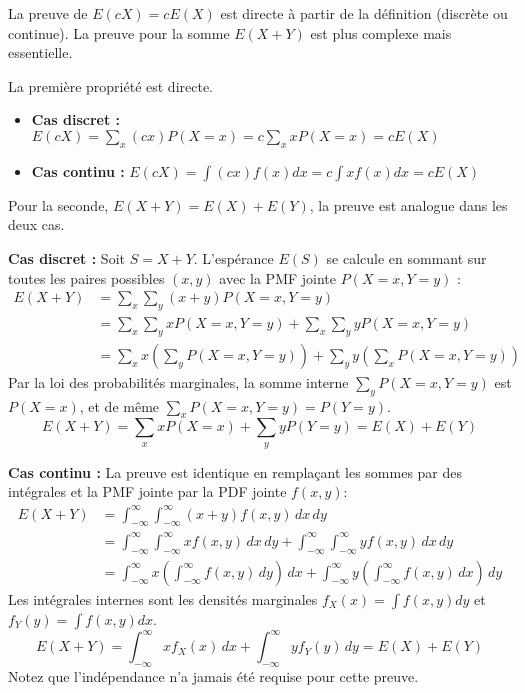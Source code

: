 La preuve de $E(cX) = cE(X)$ est directe à partir de la définition (discrète ou continue). La preuve pour la somme $E(X+Y)$ est plus complexe mais essentielle.

\begin{proofbox}
La première propriété est directe.
\begin{itemize}
    \item \textbf{Cas discret :} $ E(cX) = \sum_x (cx) P(X=x) = c \sum_x x P(X=x) = cE(X) $
    \item \textbf{Cas continu :} $ E(cX) = \int (cx) f(x) dx = c \int x f(x) dx = cE(X) $
\end{itemize}

Pour la seconde, $E(X+Y) = E(X) + E(Y)$, la preuve est analogue dans les deux cas.

\textbf{Cas discret :} Soit $S = X+Y$. L'espérance $E(S)$ se calcule en sommant sur toutes les paires possibles $(x, y)$ avec la PMF jointe $P(X=x, Y=y)$ :
\begin{align*}
E(X+Y) &= \sum_x \sum_y (x+y) P(X=x, Y=y) \\
&= \sum_x \sum_y x P(X=x, Y=y) + \sum_x \sum_y y P(X=x, Y=y) \\
&= \sum_x x \left( \sum_y P(X=x, Y=y) \right) + \sum_y y \left( \sum_x P(X=x, Y=y) \right)
\end{align*}
Par la loi des probabilités marginales, la somme interne $\sum_y P(X=x, Y=y)$ est $P(X=x)$, et de même $\sum_x P(X=x, Y=y) = P(Y=y)$.
$$ E(X+Y) = \sum_x x P(X=x) + \sum_y y P(Y=y) = E(X) + E(Y) $$

\textbf{Cas continu :} La preuve est identique en remplaçant les sommes par des intégrales et la PMF jointe par la PDF jointe $f(x, y)$:
\begin{align*}
E(X+Y) &= \int_{-\infty}^{\infty} \int_{-\infty}^{\infty} (x+y) f(x, y) \, dx \, dy \\
&= \int_{-\infty}^{\infty} \int_{-\infty}^{\infty} x f(x, y) \, dx \, dy + \int_{-\infty}^{\infty} \int_{-\infty}^{\infty} y f(x, y) \, dx \, dy \\
&= \int_{-\infty}^{\infty} x \left( \int_{-\infty}^{\infty} f(x, y) \, dy \right) \, dx + \int_{-\infty}^{\infty} y \left( \int_{-\infty}^{\infty} f(x, y) \, dx \right) \, dy
\end{align*}
Les intégrales internes sont les densités marginales $f_X(x) = \int f(x, y) dy$ et $f_Y(y) = \int f(x, y) dx$.
$$ E(X+Y) = \int_{-\infty}^{\infty} x f_X(x) \, dx + \int_{-\infty}^{\infty} y f_Y(y) \, dy = E(X) + E(Y) $$
Notez que l'indépendance n'a jamais été requise pour cette preuve.
\end{proofbox}

